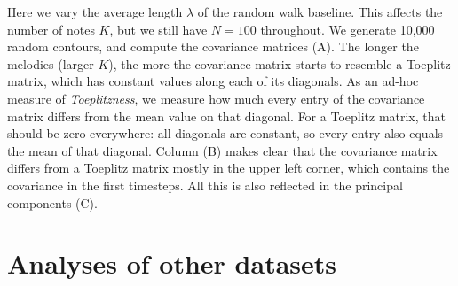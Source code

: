 \documentclass[a4paper, fontsize=9pt, twocolumn]{scrreprt}
\begin{document}
\noindent
Here we vary the average length $\lambda$ of the random walk baseline.
This affects the number of notes $K$, but we still have $N=100$ throughout.
We generate 10,000 random contours, and compute the covariance matrices (A).
The longer the melodies (larger $K$), the more the covariance matrix starts to resemble a Toeplitz matrix, which has constant values along each of its diagonals.
As an ad-hoc measure of \emph{Toeplitzness}, we measure how much every entry of the covariance matrix differs from the mean value on that diagonal. 
For a Toeplitz matrix, that should be zero everywhere: all diagonals are constant, so every entry also equals the mean of that diagonal.
Column (B) makes clear that the covariance matrix differs from a Toeplitz matrix mostly in the upper left corner, which contains the covariance in the first timesteps. 
All this is also reflected in the principal components (C).



\chapter{Analyses of other datasets}
\end{document}
